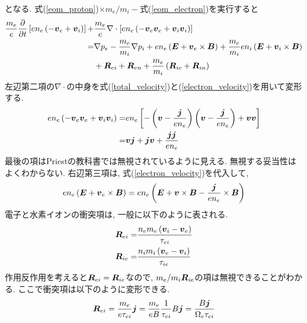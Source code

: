 \documentclass[12pt,a4j]{ltjarticle}
\newcommand{\bm}[1]{{\mbox{\boldmath $#1$}}}
\begin{document}
    となる.
    式(\ref{eom_proton})$\times m_e/m_i-$式(\ref{eom_electron})を実行すると
    \begin{align}
        \frac{m_e}{e}
        \frac{\partial}{\partial t}
        \left[
        en_e\left(
        -\bm{v}_e + \bm{v}_i
        \right)
        \right] +& 
        \frac{m_e}{e}
        \nabla\cdot
        \left[
            en_e
            \left(
            -\bm{v}_e\bm{v}_e + \bm{v}_i \bm{v}_i
            \right)
        \right] \nonumber   \\ =&
        \nabla p_e 
        -\frac{m_e}{m_i}\nabla p_i  +
        en_e
        \left(\bm{E}+\bm{v}_e\times\bm{B}\right)
        + \frac{m_e}{m_i}en_i
        \left(\bm{E}+\bm{v}_i\times\bm{B}\right) \nonumber\\
        &+ \bm{R}_{ei} + \bm{R}_{en} + 
        \frac{m_e}{m_i}\left(\bm{R}_{ie} + \bm{R}_{in}\right)
    \end{align}
    左辺第二項の$\nabla\cdot$の中身を式(\ref{total_velocity})と(\ref{electron_velocity})を用いて変形する.
    \begin{align}
        en_e\left(-\bm{v}_e\bm{v}_e + \bm{v}_i\bm{v}_i\right) =& en_e
        \left[
            -\left(\bm{v}-\frac{\bm{j}}{en_e}\right)\left(\bm{v}-\frac{\bm{j}}{en_e}\right)
            + \bm{v}\bm{v}
        \right] \nonumber\\
        =& \bm{v}\bm{j} + \bm{j}\bm{v} + \frac{\bm{jj}}{en_e}
    \end{align}
    最後の項はPriestの教科書では無視されているように見える. 無視する妥当性はよくわからない. 右辺第三項は, 式(\ref{electron_velocity})を代入して, 
    \begin{align}
        en_e\left(\bm{E}+\bm{v}_e\times\bm{B}\right) = en_e
        \left(
            \bm{E} + \bm{v}\times\bm{B} - \frac{\bm{j}}{en_e}\times\bm{B}
        \right)
    \end{align}
    電子と水素イオンの衝突項は, 一般に以下のように表される.
    \begin{align}
        \bm{R}_{ei} =& \frac{n_em_e\left(\bm{v}_i-\bm{v}_e\right)}{\tau_{ei}} \\
        \bm{R}_{ie} =& \frac{n_im_i\left(\bm{v}_e-\bm{v}_i\right)}{\tau_{ie}}
    \end{align}
    作用反作用を考えると$\bm{R}_{ei}=\bm{R}_{ie}$なので, $m_e/m_i\bm{R}_{ie}$の項は無視できることがわかる.
    ここで衝突項は以下のように変形できる.
    \begin{align}
        \bm{R}_{ei} = \frac{m_e}{e\tau_{ei}}\bm{j} = \frac{m_e}{eB}\frac{1}{\tau_{ei}}B\bm{j} = 
        \frac{B\bm{j}}{\Omega_{e}\tau_{ei}}
    \end{align}
\end{document}
